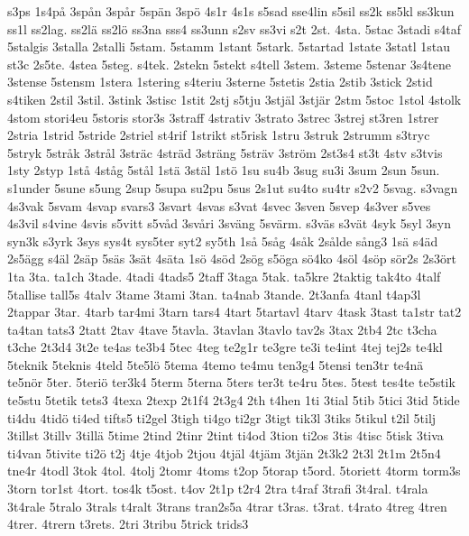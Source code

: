 {{s3ps
1s4p^^e5
3sp^^e5n
3sp^^e5r
5sp^^e4n
3sp^^f6
4s1r
4s1s
s5sad
sse4lin
s5sil
ss2k
ss5kl
ss3kun
ss1l
ss2lag.
ss2l^^e4
ss2l^^f6
ss3na
sss4
ss3unn
s2sv
ss3vi
s2t
2st.
4sta.
5stac
3stadi
s4taf
5stalgis
3stalla
2stalli
5stam.
5stamm
1stant
5stark.
5startad
1state
3statl
1stau
st3c
2s5te.
4stea
5steg.
s4tek.
2stekn
5stekt
s4tell
3stem.
3steme
5stenar
3s4tene
3stense
5stensm
1stera
1stering
s4teriu
3sterne
5stetis
2stia
2stib
3stick
2stid
s4tiken
2stil
3stil.
3stink
3stisc
1stit
2stj
s5tju
3stj^^e4l
3stj^^e4r
2stm
5stoc
1stol
4stolk
4stom
stori4eu
5storis
stor3s
3straff
4strativ
3strato
3strec
3strej
st3ren
1strer
2stria
1strid
5stride
2striel
st4rif
1strikt
st5risk
1stru
3struk
2strumm
s3tryc
5stryk
5str^^e5k
3str^^e5l
3str^^e4c
4str^^e4d
3str^^e4ng
5str^^e4v
3str^^f6m
2st3s4
st3t
4stv
s3tvis
1sty
2styp
1st^^e5
4st^^e5g
5st^^e5l
1st^^e4
3st^^e4l
1st^^f6
1su
su4b
3sug
su3i
3sum
2sun
5sun.
s1under
5sune
s5ung
2sup
5supa
su2pu
5sus
2s1ut
su4to
su4tr
s2v2
5svag.
s3vagn
4s3vak
5svam
4svap
svars3
3svart
4svas
s3vat
4svec
3sven
5svep
4s3ver
s5ves
4s3vil
s4vine
4svis
s5vitt
s5v^^e5d
3sv^^e5ri
3sv^^e4ng
5sv^^e4rm.
s3v^^e4s
s3v^^e4t
4syk
5syl
3syn
syn3k
s3yrk
3sys
sys4t
sys5ter
syt2
sy5th
1s^^e5
5s^^e5g
4s^^e5k
2s^^e5lde
s^^e5ng3
1s^^e4
s4^^e4d
2s5^^e4gg
s4^^e4l
2s^^e4p
5s^^e4s
3s^^e4t
4s^^e4ta
1s^^f6
4s^^f6d
2s^^f6g
s5^^f6ga
s^^f64ko
4s^^f6l
4s^^f6p
s^^f6r2s
2s3^^f6rt
1ta
3ta.
ta1ch
3tade.
4tadi
4tads5
2taff
3taga
5tak.
ta5kre
2taktig
tak4to
4talf
5tallise
tall5s
4talv
3tame
3tami
3tan.
ta4nab
3tande.
2t3anfa
4tanl
t4ap3l
2tappar
3tar.
4tarb
tar4mi
3tarn
tars4
4tart
5tartavl
4tarv
4task
3tast
ta1str
tat2
ta4tan
tats3
2tatt
2tav
4tave
5tavla.
3tavlan
3tavlo
tav2s
3tax
2tb4
2tc
t3cha
t3che
2t3d4
3t2e
te4as
te3b4
5tec
4teg
te2g1r
te3gre
te3i
te4int
4tej
tej2s
te4kl
5teknik
5teknis
4teld
5te5l^^f6
5tema
4temo
te4mu
ten3g4
5tensi
ten3tr
te4n^^e4
te5n^^f6r
5ter.
5teri^^f6
ter3k4
5term
5terna
5ters
ter3t
te4ru
5tes.
5test
tes4te
te5stik
te5stu
5tetik
tets3
4texa
2texp
2t1f4
2t3g4
2th
t4hen
1ti
3tial
5tib
5tici
3tid
5tide
ti4du
4tid^^f6
ti4ed
tifts5
ti2gel
3tigh
ti4go
ti2gr
3tigt
tik3l
3tiks
5tikul
t2il
5tilj
3tillst
3tillv
3till^^e4
5time
2tind
2tinr
2tint
ti4od
3tion
ti2os
3tis
4tisc
5tisk
3tiva
ti4van
5tivite
ti2^^f6
t2j
4tje
4tjob
2tjou
4tj^^e4l
4tj^^e4m
3tj^^e4n
2t3k2
2t3l
2t1m
2t5n4
tne4r
4todl
3tok
4tol.
4tolj
2tomr
4toms
t2op
5torap
t5ord.
5toriett
4torm
torm3s
3torn
tor1st
4tort.
tos4k
t5ost.
t4ov
2t1p
t2r4
2tra
t4raf
3trafi
3t4ral.
t4rala
3t4rale
5tralo
3trals
t4ralt
3trans
tran2s5a
4trar
t3ras.
t3rat.
t4rato
4treg
4tren
4trer.
4trern
t3rets.
2tri
3tribu
5trick
trids3
}}
